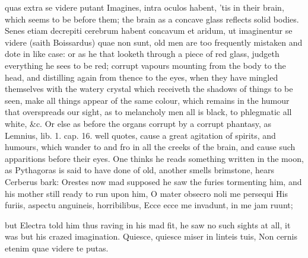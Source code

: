 {quas extra se videre putant Imagines, intra oculos habent, 'tis in
their brain, which seems to be before them; the brain as a concave
glass reflects solid bodies. Senes etiam decrepiti cerebrum habent
concavum et aridum, ut imaginentur se videre (saith Boissardus)
quae non sunt, old men are too frequently mistaken and dote in like
case: or as he that looketh through a piece of red glass, judgeth
everything he sees to be red; corrupt vapours mounting from the body to
the head, and distilling again from thence to the eyes, when they have
mingled themselves with the watery crystal which receiveth the shadows
of things to be seen, make all things appear of the same colour, which
remains in the humour that overspreads our sight, as to melancholy men
all is black, to phlegmatic all white, \&c. Or else as before the organs
corrupt by a corrupt phantasy, as Lemnius, lib. 1. cap. 16. well
quotes, cause a great agitation of spirits, and humours, which
wander to and fro in all the creeks of the brain, and cause such
apparitions before their eyes. One thinks he reads something written in
the moon, as Pythagoras is said to have done of old, another smells
brimstone, hears Cerberus bark: Orestes now mad supposed he saw the
furies tormenting him, and his mother still ready to run upon him,
O mater obsecro noli me persequi
His furiis, aspectu anguineis, horribilibus,
Ecce ecce me invadunt, in me jam ruunt;

but Electra told him thus raving in his mad fit, he saw no such sights
at all, it was but his crazed imagination.
Quiesce, quiesce miser in linteis tuis,
Non cernis etenim quae videre te putas.

}
